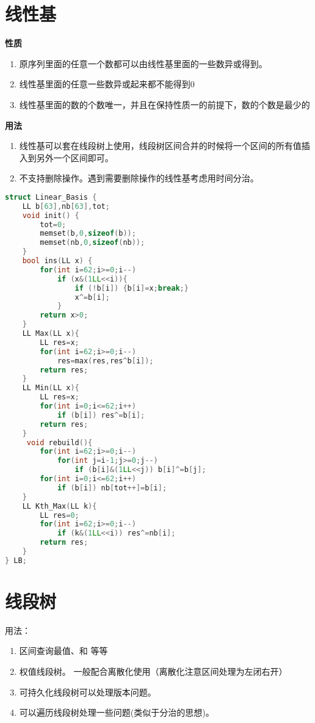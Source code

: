 \documentclass[]{article}
\begin{document}
\section{线性基}

\Large{\textbf{性质}}
\normalsize

\begin{enumerate}
    \item 原序列里面的任意一个数都可以由线性基里面的一些数异或得到。
    \item 线性基里面的任意一些数异或起来都不能得到0 
    \item 线性基里面的数的个数唯一，并且在保持性质一的前提下，数的个数是最少的
\end{enumerate}

\Large{\textbf{用法}}
\normalsize

\begin{enumerate}
    \item 线性基可以套在线段树上使用，线段树区间合并的时候将一个区间的所有值插入到另外一个区间即可。
    \item 不支持删除操作。遇到需要删除操作的线性基考虑用时间分治。
\end{enumerate}

\begin{lstlisting}[language={c}]
    struct Linear_Basis {
    LL b[63],nb[63],tot;
    void init() {
        tot=0;
        memset(b,0,sizeof(b));
        memset(nb,0,sizeof(nb));
    }
    bool ins(LL x) {
        for(int i=62;i>=0;i--)
            if (x&(1LL<<i)){
                if (!b[i]) {b[i]=x;break;}
                x^=b[i];
            }
        return x>0;
    }
    LL Max(LL x){
        LL res=x;
        for(int i=62;i>=0;i--)
            res=max(res,res^b[i]);
        return res;
    }
    LL Min(LL x){
        LL res=x;
        for(int i=0;i<=62;i++)
            if (b[i]) res^=b[i];
        return res;
    }
     void rebuild(){
        for(int i=62;i>=0;i--)
            for(int j=i-1;j>=0;j--)
                if (b[i]&(1LL<<j)) b[i]^=b[j];
        for(int i=0;i<=62;i++)
            if (b[i]) nb[tot++]=b[i];
    }
    LL Kth_Max(LL k){
        LL res=0;
        for(int i=62;i>=0;i--)
            if (k&(1LL<<i)) res^=nb[i];
        return res;
    }
} LB;
\end{lstlisting}


\section{线段树}
用法：
\begin{enumerate}
    \item 区间查询最值、和 等等
    \item 权值线段树。 一般配合离散化使用（离散化注意区间处理为左闭右开）
    \item 可持久化线段树可以处理版本问题。
    \item 可以遍历线段树处理一些问题(类似于分治的思想)。
\end{enumerate}
\end{document}
